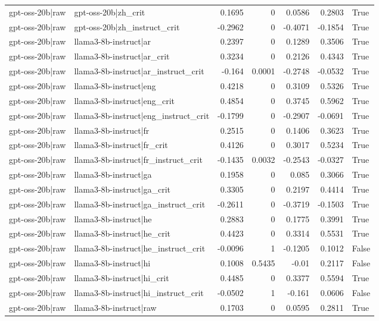 \begin{table}
\begin{tabular}{l l r r r r l}
gpt-oss-20b|raw & gpt-oss-20b|zh_crit & 0.1695 & 0 & 0.0586 & 0.2803 & True \\
gpt-oss-20b|raw & gpt-oss-20b|zh_instruct_crit & -0.2962 & 0 & -0.4071 & -0.1854 & True \\
gpt-oss-20b|raw & llama3-8b-instruct|ar & 0.2397 & 0 & 0.1289 & 0.3506 & True \\
gpt-oss-20b|raw & llama3-8b-instruct|ar_crit & 0.3234 & 0 & 0.2126 & 0.4343 & True \\
gpt-oss-20b|raw & llama3-8b-instruct|ar_instruct_crit & -0.164 & 0.0001 & -0.2748 & -0.0532 & True \\
gpt-oss-20b|raw & llama3-8b-instruct|eng & 0.4218 & 0 & 0.3109 & 0.5326 & True \\
gpt-oss-20b|raw & llama3-8b-instruct|eng_crit & 0.4854 & 0 & 0.3745 & 0.5962 & True \\
gpt-oss-20b|raw & llama3-8b-instruct|eng_instruct_crit & -0.1799 & 0 & -0.2907 & -0.0691 & True \\
gpt-oss-20b|raw & llama3-8b-instruct|fr & 0.2515 & 0 & 0.1406 & 0.3623 & True \\
gpt-oss-20b|raw & llama3-8b-instruct|fr_crit & 0.4126 & 0 & 0.3017 & 0.5234 & True \\
gpt-oss-20b|raw & llama3-8b-instruct|fr_instruct_crit & -0.1435 & 0.0032 & -0.2543 & -0.0327 & True \\
gpt-oss-20b|raw & llama3-8b-instruct|ga & 0.1958 & 0 & 0.085 & 0.3066 & True \\
gpt-oss-20b|raw & llama3-8b-instruct|ga_crit & 0.3305 & 0 & 0.2197 & 0.4414 & True \\
gpt-oss-20b|raw & llama3-8b-instruct|ga_instruct_crit & -0.2611 & 0 & -0.3719 & -0.1503 & True \\
gpt-oss-20b|raw & llama3-8b-instruct|he & 0.2883 & 0 & 0.1775 & 0.3991 & True \\
gpt-oss-20b|raw & llama3-8b-instruct|he_crit & 0.4423 & 0 & 0.3314 & 0.5531 & True \\
gpt-oss-20b|raw & llama3-8b-instruct|he_instruct_crit & -0.0096 & 1 & -0.1205 & 0.1012 & False \\
gpt-oss-20b|raw & llama3-8b-instruct|hi & 0.1008 & 0.5435 & -0.01 & 0.2117 & False \\
gpt-oss-20b|raw & llama3-8b-instruct|hi_crit & 0.4485 & 0 & 0.3377 & 0.5594 & True \\
gpt-oss-20b|raw & llama3-8b-instruct|hi_instruct_crit & -0.0502 & 1 & -0.161 & 0.0606 & False \\
gpt-oss-20b|raw & llama3-8b-instruct|raw & 0.1703 & 0 & 0.0595 & 0.2811 & True \\

\end{tabular}
\end{table}
